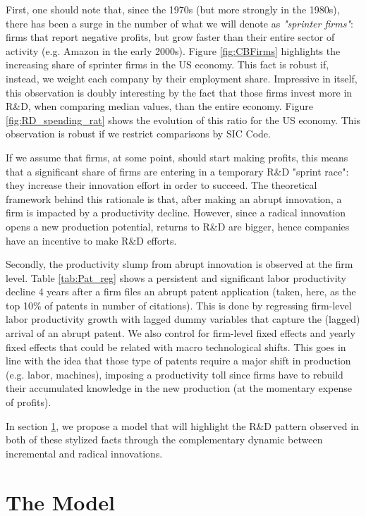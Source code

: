 \documentclass[letterpaper,12pt]{article}
\theoremstyle{definition}
\begin{document}
First, one should note that, since the 1970s (but more strongly in the 1980s), there has been a surge in the number of what we will denote as \textit{"sprinter firms"}: firms that report negative profits, but grow faster than their entire sector of activity (e.g. Amazon in the early 2000s). Figure \ref{fig:CBFirms} highlights the increasing share of sprinter firms in the US economy. This fact is robust if, instead, we weight each company by their employment share. Impressive in itself, this observation is doubly interesting by the fact that those firms invest more in R\&D, when comparing median values, than the entire economy. Figure \ref{fig:RD_spending_rat} shows the evolution of this ratio for the US economy. This observation is robust if we restrict comparisons by SIC Code.

If we assume that firms, at some point, should start making profits, this means that a significant share of firms are entering in a temporary R\&D "sprint race": they increase their innovation effort in order to succeed. The theoretical framework behind this rationale is that, after making an abrupt innovation, a firm is impacted by a productivity decline. However, since a radical innovation opens a new production potential, returns to R\&D are bigger, hence companies have an incentive to make R\&D efforts.

Secondly, the productivity slump from abrupt innovation is observed at the firm level. Table \ref{tab:Pat_reg} shows a persistent and significant labor productivity decline 4 years after a firm files an abrupt patent application (taken, here, as the top 10\% of patents in number of citations). This is done by regressing firm-level labor productivity growth with lagged dummy variables that capture the (lagged) arrival of an abrupt patent. We also control for firm-level fixed effects and yearly fixed effects that could be related with macro technological shifts. This goes in line with the idea that those type of patents require a major shift in production (e.g. labor, machines), imposing a productivity toll since firms have to rebuild their accumulated knowledge in the new production (at the momentary expense of profits).

In section \ref{sec:Model}, we propose a model that will highlight the R\&D pattern observed in both of these stylized facts through the complementary dynamic between incremental and radical innovations.

\section{The Model} \label{sec:Model}
\end{document}
